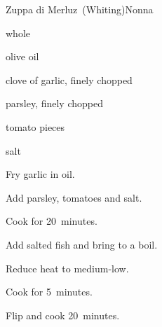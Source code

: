 \begin{recipe}{Zuppa di Merluz~(Whiting)}{Nonna}{}

\begin{ingredients}
\item whole 
\item olive oil
\item clove of garlic, finely chopped
\item parsley, finely chopped
\item tomato pieces
\item salt
\end{ingredients}

\begin{directions}
\item Fry garlic in oil.
\item Add parsley, tomatoes and salt.
\item Cook for 20~minutes.
\item Add salted fish and bring to a boil.
\item Reduce heat to medium-low.
\item Cook for 5~minutes.
\item Flip and cook 20~minutes.
\end{directions}

\end{recipe}
